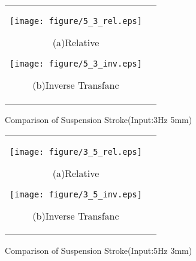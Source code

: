 \documentclass[a4paper,12pt]{article_vdlab_sotsuron}
\begin{document}
\vspace*{10mm}
\begin{figure}[h]
  \begin{tabular}{cc}
  \begin{minipage}{0.5\hsize}
  \begin{center}
    \texttt{[image: figure/5\_3\_rel.eps]}
    \end{center}
    \begin{center}
    \ (a)Relative\
    \end{center}
  \end{minipage}
  \begin{minipage}{0.5\hsize}
     \begin{center}
      \texttt{[image: figure/5\_3\_inv.eps]}
      \end{center}
      \begin{center}
      \ (b)Inverse Transfanc\
    \end{center}
  \end{minipage}
  \end{tabular}
  \vspace*{3mm}
  \caption{Comparison of Suspension Stroke(Input:3Hz 5mm)}
    \label{fig:sim_5_3}
\end{figure}
\begin{figure}[h]
  \begin{tabular}{cc}
  \begin{minipage}{0.5\hsize}
  \begin{center}
    \texttt{[image: figure/3\_5\_rel.eps]}
    \end{center}
    \begin{center}
    \ (a)Relative\
    \end{center}
  \end{minipage}
  \begin{minipage}{0.5\hsize}
     \begin{center}
      \texttt{[image: figure/3\_5\_inv.eps]}
      \end{center}
      \begin{center}
      \ (b)Inverse Transfanc\
    \end{center}
  \end{minipage}
  \end{tabular}
  \vspace*{3mm}
  \caption{Comparison of Suspension Stroke(Input:5Hz 3mm)}
    \label{fig:sim_3_5}
\end{figure}
\end{document}

